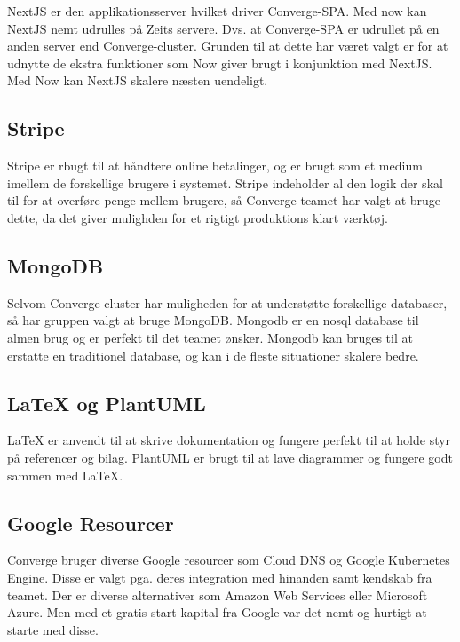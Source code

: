 NextJS er den applikationsserver hvilket driver Converge-SPA. Med now kan NextJS nemt udrulles på Zeits servere. Dvs. at Converge-SPA er udrullet på en anden server end Converge-cluster. Grunden til at dette har været valgt er for at udnytte de ekstra funktioner som Now giver brugt i konjunktion med NextJS. Med Now kan NextJS skalere næsten uendeligt.

\subsection{Stripe}

Stripe er rbugt til at håndtere online betalinger, og er brugt som et medium imellem de forskellige brugere i systemet. Stripe indeholder al den logik der skal til for at overføre penge mellem brugere, så Converge-teamet har valgt at bruge dette, da det giver mulighden for et rigtigt produktions klart værktøj.

\subsection{MongoDB}

Selvom Converge-cluster har muligheden for at understøtte forskellige databaser, så har gruppen valgt at bruge MongoDB. Mongodb er en nosql database til almen brug og er perfekt til det teamet ønsker. Mongodb kan bruges til at erstatte en traditionel database, og kan i de fleste situationer skalere bedre.

\subsection{LaTeX og PlantUML}

LaTeX er anvendt til at skrive dokumentation og fungere perfekt til at holde styr på referencer og bilag. PlantUML er brugt til at lave diagrammer og fungere godt sammen med LaTeX.

\subsection{Google Resourcer}

Converge bruger diverse Google resourcer som Cloud DNS og Google Kubernetes Engine. Disse er valgt pga. deres integration med hinanden samt kendskab fra teamet. Der er diverse alternativer som Amazon Web Services eller Microsoft Azure. Men med et gratis start kapital fra Google var det nemt og hurtigt at starte med disse.